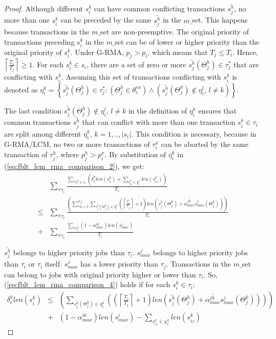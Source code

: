 \documentclass[prodmode,acmtecs]{acmsmall}
\begin{document}
\begin{proof}
Although different $s_{i}^{k}$ can have common conflicting transactions
$\bar{s_{j}^{h}}$, no more than one $s_{i}^{k}$ can be preceded
by the same $\bar{s_{j}^{h}}$ in the $m\_$set. This happens because
transactions in the $m\_$set are non-preemptive. The original priority
of transactions preceding $s_{i}^{k}$ in the $m\_$set can be of
lower or higher priority than the original priority of $s_{i}^{k}$. Under
G-RMA, $p_{j}>p_{i}$, which means that $T_{j}\le T_{i}$. Hence, $\left\lceil \frac{T_{i}}{T_{j}}\right\rceil \ge1$.
For each $s_{i}^{k}\in s_{i}$, there are a set of zero or more $\bar{s_{j}^{h}}(\Theta_j^h)\in\tau_{j}^{*}$
that are conflicting with $s_{i}^{k}$. Assuming this set of transactions conflicting with $s_{i}^{k}$ is denoted as $\eta_{i}^{k}=\left\{ \bar{s_{j}^{h}}(\Theta_j^h)\in\tau_{j}^{*}:\left(\Theta_j^h\in\theta_{i}^{ex}\right)\wedge\left(\bar{s_{j}^{h}}(\Theta_j^h)\not\in\eta_{i}^{l},\, l\ne k\right)\right\} $.


The last condition $\bar{s_{j}^{h}}(\Theta_j^h)\not\in\eta_{i}^{l},\, l\ne k$
in the definition of $\eta_{i}^{k}$ ensures that common transactions
$\bar{s_{j}^{h}}$ that can conflict with more than one transaction
$s_{i}^{k}\in\tau_{i}$ are split among different $\eta_{i}^{k},\, k=1,..,|s_{i}|$.
This condition is necessary, because in G-RMA/LCM, no two or more transactions
of $\tau_{i}^{x}$ can be aborted by the same transaction of $\tau_{j}^{h}$, 
where $p_{j}^{h}>p_{i}^{x}$. By substitution of $\eta_{i}^{k}$ in
(\ref{eq:fblt_lcm_rma_comparison_2}), we get: 
\begin{eqnarray}
 & \sum_{\forall\tau_{i}}\frac{\sum_{\forall s_{i}^{k}\in s_{i}}\left(\delta_i^klen(s_{i}^{k})+\sum_{s_{iz}^{k}\in\chi_{i}^{k}}len(s_{iz}^{k})\right)}{T_{i}}\label{eq:fblt_lcm_rma_comparison_4}\\
\le & \sum_{\forall\tau_{i}}\frac{\left(\sum_{\forall k=1}^{|s_{i}|}\sum_{\bar{s_{j}^{h}}(\Theta_j^h)\in\eta_{i}^{k}}\left(\left\lceil \frac{T_{i}}{T_{j}}\right\rceil +1\right)len\left(\bar{s_{j}^{h}}(\Theta_j^h)+\bar{\alpha_{max}^{jh}}s_{max}^{j}(\Theta_j^h)\right)\right)}{T_{i}}\nonumber \\
+ & \sum_{\forall\tau_{i}}\frac{\sum_{\forall s_{i}^{k}}\left(1-\alpha_{max}^{ik}\right)len(s_{max}^{i})}{T_{i}}\nonumber 
\end{eqnarray}

$\bar{s_{j}^{h}}$ belongs to higher priority jobs than $\tau_{i}$. $s_{max}^{j}$ belongs to higher priority jobs than $\tau_{i}$ or $\tau_{i}$ itself. $s_{max}^{j}$ has a lower priority than $\tau_j$. Transactions in the $m\_$set can belong to jobs
with original priority higher or lower than $\tau_{i}$. So, (\ref{eq:fblt_lcm_rma_comparison_4})
holds if for each $s_{i}^{k}\in\tau_{i}$: 
\begin{eqnarray}
\delta_i^klen(s_{i}^{k}) & \le & \left(\sum_{\bar{s_{j}^{h}}(\Theta_j^h)\in\eta_{i}^{k}}\left(\left(\left\lceil \frac{T_{i}}{T_{j}}\right\rceil +1\right)len\left(\bar{s_{j}^{h}}(\Theta_j^h)+\bar{\alpha_{max}^{jh}}s_{max}^{j}(\Theta_j^h)\right)\right)\right)\nonumber\\
 & + & \left(1-\alpha_{max}^{ik}\right)len(s_{max}^{i})-\sum_{s_{iz}^{k}\in\chi_{i}^{k}}len(s_{iz}^{k})
 \nonumber
\end{eqnarray}


\end{proof}
\end{document}
